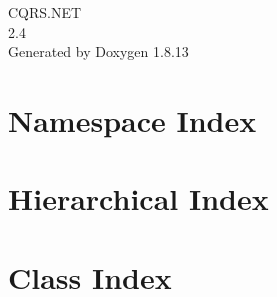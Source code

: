 \documentclass[twoside]{book}
\newcommand{\+}{\discretionary{\mbox{\scriptsize$\hookleftarrow$}}{}{}}
\newcommand{\clearemptydoublepage}{%
  \newpage{\pagestyle{empty}\cleardoublepage}%
}
\begin{document}
\hypersetup{pageanchor=false,
             bookmarksnumbered=true,
             pdfencoding=unicode
            }
\begin{titlepage}
\vspace*{7cm}
\begin{center}%
{\Large C\+Q\+R\+S.\+N\+ET \\[1ex]\large 2.\+4 }\\
\vspace*{1cm}
{\large Generated by Doxygen 1.8.13}\\
\end{center}
\end{titlepage}
\clearemptydoublepage
{}
\tableofcontents
\clearemptydoublepage
{}
\hypersetup{pageanchor=true}

\chapter{Namespace Index}

\chapter{Hierarchical Index}

\chapter{Class Index}

\end{document}
